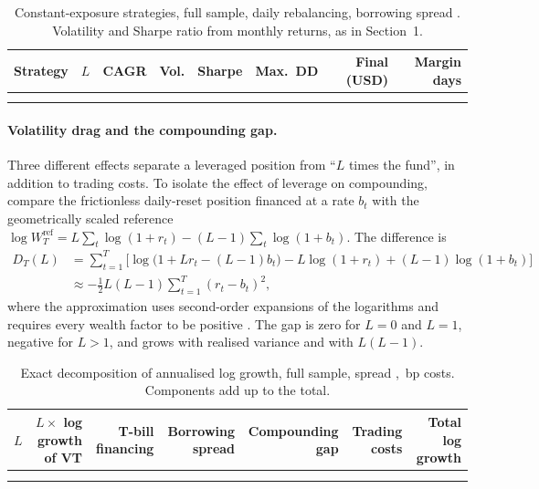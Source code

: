 \documentclass[11pt,a4paper]{article}
\begin{document}
\begin{table}[H]
\small
\caption{Constant-exposure strategies, full sample, daily rebalancing, borrowing spread . Volatility and Sharpe ratio from monthly returns, as in Section~1.}
\label{tab:kstrat}
\begin{tabularx}{\linewidth}{L r r r r r r r}
\toprule
\textbf{Strategy} & \textbf{$L$} & \textbf{CAGR} & \textbf{Vol.} & \textbf{Sharpe} & \textbf{Max.\ DD} & \textbf{Final (USD)} & \textbf{Margin days} \\
\midrule
{}
 &  &  &  &  &  &  &  \\
\bottomrule
\end{tabularx}
\end{table}


\paragraph{Volatility drag and the compounding gap.} Three different effects separate a leveraged position from ``$L$ times the fund'', in addition to trading costs. To isolate the effect of leverage on compounding, compare the frictionless daily-reset position financed at a rate $b_t$ with the geometrically scaled reference $\log W^{\text{ref}}_T = L\sum_t \log(1+r_t) - (L-1)\sum_t\log(1+b_t)$. The difference is
\begin{align*}
D_T(L) &= \sum_{t=1}^{T}\Big[\log\big(1 + L r_t - (L-1) b_t\big) - L\log(1+r_t) + (L-1)\log(1+b_t)\Big] \\
&\approx -\tfrac12 L(L-1)\sum_{t=1}^{T}(r_t - b_t)^2 ,
\end{align*}
where the approximation uses second-order expansions of the logarithms and requires every wealth factor to be positive \citep{cheng2009,avellaneda2010}. The gap is zero for $L=0$ and $L=1$, negative for $L>1$, and grows with realised variance and with $L(L-1)$.

\begin{table}[H]
\small
\caption{Exact decomposition of annualised log growth, full sample, spread , \,bp costs. Components add up to the total.}
\label{tab:kdecomp}
\setlength{\tabcolsep}{4pt}
\begin{tabularx}{\linewidth}{l R R R R R R}
\toprule
\textbf{$L$} & \textbf{$L\times$ log growth of VT} & \textbf{T-bill financing} & \textbf{Borrowing spread} & \textbf{Compoun\-ding gap} & \textbf{Trading costs} & \textbf{Total log growth} \\
\midrule
{}
 &  &  &  &  &  &  \\
\bottomrule
\end{tabularx}
\end{table}
\end{document}
